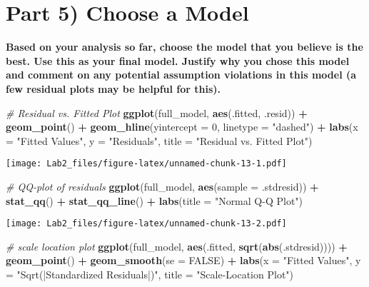 \documentclass[
]{article}
\newenvironment{Shaded}{\begin{snugshade}}{\end{snugshade}}
\newcommand{\AttributeTok}[1]{\textcolor[rgb]{0.13,0.29,0.53}{#1}}
\newcommand{\CommentTok}[1]{\textcolor[rgb]{0.56,0.35,0.01}{\textit{#1}}}
\newcommand{\ConstantTok}[1]{\textcolor[rgb]{0.56,0.35,0.01}{#1}}
\newcommand{\DecValTok}[1]{\textcolor[rgb]{0.00,0.00,0.81}{#1}}
\newcommand{\FunctionTok}[1]{\textcolor[rgb]{0.13,0.29,0.53}{\textbf{#1}}}
\newcommand{\NormalTok}[1]{#1}
\newcommand{\SpecialCharTok}[1]{\textcolor[rgb]{0.81,0.36,0.00}{\textbf{#1}}}
\newcommand{\StringTok}[1]{\textcolor[rgb]{0.31,0.60,0.02}{#1}}
\begin{document}
\section{Part 5) Choose a Model}\label{part-5-choose-a-model}

\textbf{Based on your analysis so far, choose the model that you believe
is the best. Use this as your final model. Justify why you chose this
model and comment on any potential assumption violations in this model
(a few residual plots may be helpful for this).}

\begin{Shaded}
\begin{Highlighting}[]
\CommentTok{\# Residual vs. Fitted Plot}
\FunctionTok{ggplot}\NormalTok{(full\_model, }\FunctionTok{aes}\NormalTok{(.fitted, .resid)) }\SpecialCharTok{+}
  \FunctionTok{geom\_point}\NormalTok{() }\SpecialCharTok{+}
  \FunctionTok{geom\_hline}\NormalTok{(}\AttributeTok{yintercept =} \DecValTok{0}\NormalTok{, }\AttributeTok{linetype =} \StringTok{"dashed"}\NormalTok{) }\SpecialCharTok{+}
  \FunctionTok{labs}\NormalTok{(}\AttributeTok{x =} \StringTok{"Fitted Values"}\NormalTok{, }\AttributeTok{y =} \StringTok{"Residuals"}\NormalTok{, }\AttributeTok{title =} \StringTok{"Residual vs. Fitted Plot"}\NormalTok{)}
\end{Highlighting}
\end{Shaded}

\texttt{[image: Lab2\_files/figure-latex/unnamed-chunk-13-1.pdf]}

\begin{Shaded}
\begin{Highlighting}[]
\CommentTok{\# QQ{-}plot of residuals}
\FunctionTok{ggplot}\NormalTok{(full\_model, }\FunctionTok{aes}\NormalTok{(}\AttributeTok{sample =}\NormalTok{ .stdresid)) }\SpecialCharTok{+}
  \FunctionTok{stat\_qq}\NormalTok{() }\SpecialCharTok{+}
  \FunctionTok{stat\_qq\_line}\NormalTok{() }\SpecialCharTok{+}
  \FunctionTok{labs}\NormalTok{(}\AttributeTok{title =} \StringTok{"Normal Q{-}Q Plot"}\NormalTok{)}
\end{Highlighting}
\end{Shaded}

\texttt{[image: Lab2\_files/figure-latex/unnamed-chunk-13-2.pdf]}

\begin{Shaded}
\begin{Highlighting}[]
\CommentTok{\# scale location plot}
\FunctionTok{ggplot}\NormalTok{(full\_model, }\FunctionTok{aes}\NormalTok{(.fitted, }\FunctionTok{sqrt}\NormalTok{(}\FunctionTok{abs}\NormalTok{(.stdresid)))) }\SpecialCharTok{+}
  \FunctionTok{geom\_point}\NormalTok{() }\SpecialCharTok{+}
  \FunctionTok{geom\_smooth}\NormalTok{(}\AttributeTok{se =} \ConstantTok{FALSE}\NormalTok{) }\SpecialCharTok{+}
  \FunctionTok{labs}\NormalTok{(}\AttributeTok{x =} \StringTok{"Fitted Values"}\NormalTok{, }\AttributeTok{y =} \StringTok{"Sqrt(|Standardized Residuals|)"}\NormalTok{, }\AttributeTok{title =} \StringTok{"Scale{-}Location Plot"}\NormalTok{)}
\end{Highlighting}
\end{Shaded}
\end{document}
